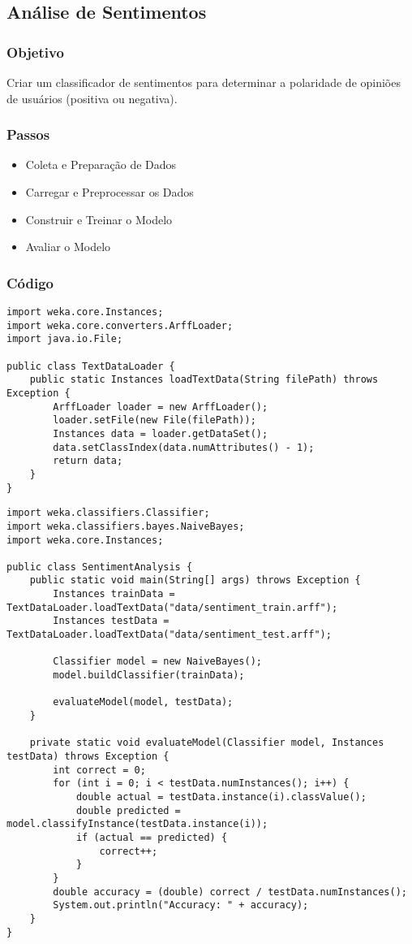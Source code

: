 \documentclass[a4paper,12pt]{book}
\begin{document}
\subsection{Análise de Sentimentos}
\subsubsection{Objetivo}
Criar um classificador de sentimentos para determinar a polaridade de opiniões de usuários (positiva ou negativa).

\subsubsection{Passos}
\begin{itemize}
    \item Coleta e Preparação de Dados
    \item Carregar e Preprocessar os Dados
    \item Construir e Treinar o Modelo
    \item Avaliar o Modelo
\end{itemize}

\subsubsection{Código}
\begin{lstlisting}
import weka.core.Instances;
import weka.core.converters.ArffLoader;
import java.io.File;

public class TextDataLoader {
    public static Instances loadTextData(String filePath) throws Exception {
        ArffLoader loader = new ArffLoader();
        loader.setFile(new File(filePath));
        Instances data = loader.getDataSet();
        data.setClassIndex(data.numAttributes() - 1);
        return data;
    }
}
\end{lstlisting}

\begin{lstlisting}
import weka.classifiers.Classifier;
import weka.classifiers.bayes.NaiveBayes;
import weka.core.Instances;

public class SentimentAnalysis {
    public static void main(String[] args) throws Exception {
        Instances trainData = TextDataLoader.loadTextData("data/sentiment_train.arff");
        Instances testData = TextDataLoader.loadTextData("data/sentiment_test.arff");

        Classifier model = new NaiveBayes();
        model.buildClassifier(trainData);

        evaluateModel(model, testData);
    }

    private static void evaluateModel(Classifier model, Instances testData) throws Exception {
        int correct = 0;
        for (int i = 0; i < testData.numInstances(); i++) {
            double actual = testData.instance(i).classValue();
            double predicted = model.classifyInstance(testData.instance(i));
            if (actual == predicted) {
                correct++;
            }
        }
        double accuracy = (double) correct / testData.numInstances();
        System.out.println("Accuracy: " + accuracy);
    }
}
\end{lstlisting}
\end{document}
